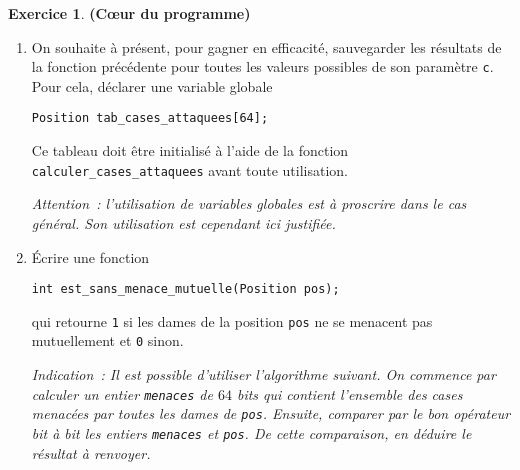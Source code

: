 \documentclass[12pt]{article}
\theoremstyle{definition}
\newtheorem{Exercice}{Exercice}
\begin{document}
\begin{Exercice}{\bf (C\oe ur du programme)}
\begin{enumerate}
    {\it Attention~: une dame ne menace pas la case sur laquelle elle
    se trouve.}
    \smallskip

    \item On souhaite à présent, pour gagner en efficacité,
    sauvegarder les résultats de la fonction précédente pour toutes
    les valeurs possibles de son paramètre {\tt c}. Pour cela,
    déclarer une variable globale
\begin{lstlisting}
Position tab_cases_attaquees[64];
\end{lstlisting}
    Ce tableau doit être initialisé à l'aide de la fonction
    {\tt calculer\_cases\_attaquees} avant toute utilisation.
    \smallskip

    {\it Attention~: l'utilisation de variables globales est à
    proscrire dans le cas général. Son utilisation est cependant ici
    justifiée.}
    \smallskip

    \item Écrire une fonction
\begin{lstlisting}
int est_sans_menace_mutuelle(Position pos);
\end{lstlisting}
    qui retourne {\tt 1} si les dames de la position {\tt pos} ne se
    menacent pas mutuellement et {\tt 0} sinon.
    \smallskip

    {\it Indication~: Il est possible d'utiliser l'algorithme
    suivant. On commence par calculer un entier {\tt menaces} de
    $64$ bits qui contient l'ensemble des cases menacées par toutes
    les dames de {\tt pos}. Ensuite, comparer par le bon opérateur
    bit à bit les entiers {\tt menaces} et {\tt pos}. De cette
    comparaison, en déduire le résultat à renvoyer.}
\end{enumerate}
\end{Exercice}
\bigskip
\end{document}
